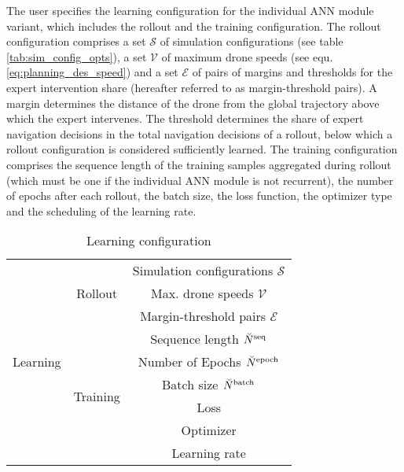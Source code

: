 The user specifies the learning configuration
for the individual ANN module variant, 
which includes the rollout and the training configuration.
The rollout configuration comprises 
a set $\mathcal{S}$ of simulation configurations 
(see table \ref{tab:sim_config_opts}),
a set $\mathcal{V}$ of maximum drone speeds 
(see equ. \ref{eq:planning_des_speed})
and a set $\mathcal{E}$ of pairs of 
margins and thresholds for the expert intervention share
(hereafter referred to as margin-threshold pairs).
A margin determines the
distance of the drone from the global trajectory
above which the expert intervenes.
The threshold determines 
the share of expert navigation decisions 
in the total navigation decisions of a rollout, 
below which a rollout configuration is considered sufficiently learned.
The training configuration comprises 
the sequence length of the training samples aggregated during rollout
(which must be one if the individual ANN module is not recurrent),
the number of epochs after each rollout,
the batch size,
the loss function,
the optimizer type and the scheduling of the learning rate.
\begin{table}[h]
    \caption{Learning configuration
    \label{tab:learn_config}}
    \centering
    \begin{tabular}{|c|c|c|} 
        \hline
        \multirow{9}{*}{Learning} 
        &\multirow{3}{*}{Rollout}   
        &Simulation configurations $\mathcal{S}$
        \\\cline{3-3}
        &
        &Max. drone speeds $\mathcal{V}$
        \\\cline{3-3}
        &
        &Margin-threshold pairs $\mathcal{E}$
        \\\cline{2-3}
        &\multirow{6}{*}{Training}   
        &Sequence length $\seqLen$
        \\\cline{3-3}
        &
        &Number of Epochs $\num[\user]{\text{epoch}}{}{}{}$
        \\\cline{3-3}
        &
        &Batch size $\batchSize$
        \\\cline{3-3}
        &
        &Loss
        \\\cline{3-3}
        &
        &Optimizer
        \\\cline{3-3}
        &
        &Learning rate
        \\\hline
    \end{tabular}
\end{table}



